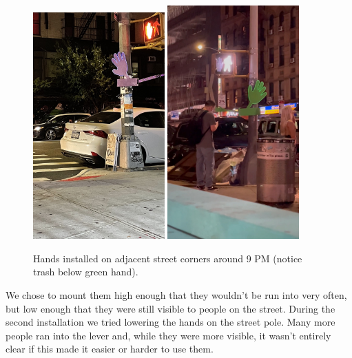 \documentclass[11pt]{report}
\begin{document}
\begin{figure}[ht!]
\centering
\includegraphics[width=0.45\textwidth]{"images/III/purplehandinstalled.JPG"}
\includegraphics[width=0.45\textwidth]{"images/III/greenhandinstalled.JPG"}
  \caption{Hands installed on adjacent street corners around 9 PM (notice trash below green hand).}
\end{figure}

We chose to mount them high enough that they wouldn't be run into very often, but low enough that they were still visible to people on the street. During the second installation we tried lowering the hands on the street pole. Many more people ran into the lever and, while they were more visible, it wasn't entirely clear if this made it easier or harder to use them. 
\end{document}
